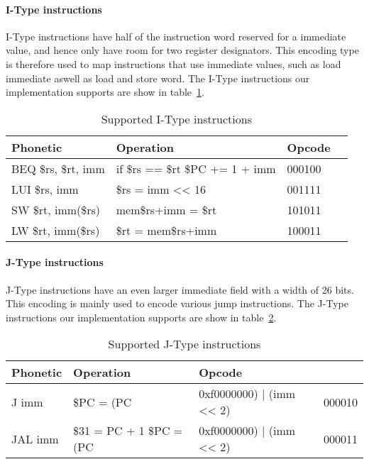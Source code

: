 \paragraph{I-Type instructions}

I-Type instructions have half of the instruction word reserved for a immediate value, and hence only have room for two register designators. This encoding type is therefore used to map instructions that use immediate values, such as load immediate aswell as load and store word. The I-Type instructions our implementation supports are show in table~\ref{table:itype_instructions}.

\begin{table}[h]
    \begin{tabular}{l|l|l|l}

    Phonetic & Operation & Opcode \\
    \hline
    BEQ \$rs, \$rt, imm  & if \$rs == \$rt \$PC += 1 + imm & 000100 \\
    LUI \$rs, imm        & \$rs = imm << 16                & 001111 \\
    SW \$rt, imm(\$rs)   & mem{\$rs+imm} = \$rt            & 101011 \\
    LW \$rt, imm(\$rs)   & \$rt = mem{\$rs+imm}            & 100011 \\
    \hline
    
    \end{tabular}

    \caption{Supported I-Type instructions}
    \label{table:itype_instructions}
\end{table}

\paragraph{J-Type instructions}

J-Type instructions have an even larger immediate field with a width of 26 bits. This encoding is mainly used to encode various jump instructions. The J-Type instructions our implementation supports are show in table~\ref{table:jtype_instructions}.

\begin{table}[h]
    \begin{tabular}{l|l|l|l}

    Phonetic & Operation & Opcode \\
    \hline
    J imm  & \$PC = (PC & 0xf0000000) | (imm << 2) & 000010 \\
    JAL imm  & \$31 = PC + 1 \$PC = (PC & 0xf0000000) | (imm << 2) & 000011 \\
    \hline
    
    \end{tabular}

    \caption{Supported J-Type instructions}
    \label{table:jtype_instructions}
\end{table}
